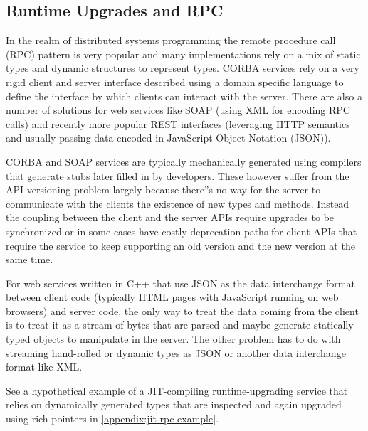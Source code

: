 \subsection{Runtime Upgrades and RPC}

In the realm of distributed systems programming the remote procedure call
(RPC) pattern is very popular and many implementations rely on a mix of static
types and dynamic structures to represent types. CORBA services rely on a very
rigid client and server interface described using a domain specific language
to define the interface by which clients can interact with the server. There
are also a number of solutions for web services like SOAP (using XML for
encoding RPC calls) and recently more popular REST interfaces (leveraging HTTP
semantics and usually passing data encoded in JavaScript Object Notation
(JSON)).

CORBA and SOAP services are typically mechanically generated using compilers
that generate stubs later filled in by developers. These however suffer from
the API versioning problem largely because there''s no way for the server to
communicate with the clients the existence of new types and methods. Instead
the coupling between the client and the server APIs require upgrades to be
synchronized or in some cases have costly deprecation paths for client APIs
that require the service to keep supporting an old version and the new version
at the same time.

For web services written in C++ that use JSON as the data interchange format
between client code (typically HTML pages with JavaScript running on web
browsers) and server code, the only way to treat the data coming from the
client is to treat it as a stream of bytes that are parsed and maybe generate
statically typed objects to manipulate in the server. The other problem has to
do with streaming hand-rolled or dynamic types as JSON or another data
interchange format like XML.

See a hypothetical example of a JIT-compiling runtime-upgrading service that
relies on dynamically generated types that are inspected and again upgraded
using rich pointers in \autoref{appendix:jit-rpc-example}.
